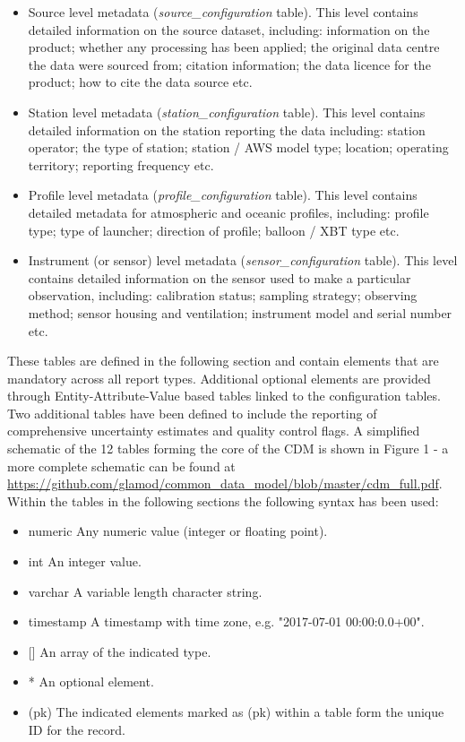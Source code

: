 \documentclass[a4paper,12pt]{article}
\begin{document}
\begin{itemize}
\item Source level metadata (\textit{source\_configuration} table). This level contains detailed information on the source dataset, including: information on the product; whether any processing has been applied; the original data centre the data were sourced from; citation information; the data licence for the product; how to cite the data source etc.
\item Station level metadata (\textit{station\_configuration} table). This level contains detailed information on the station reporting the data including: station operator; the type of station; station / AWS model type; location; operating territory; reporting frequency etc.
\item Profile level metadata (\textit{profile\_configuration} table). This level contains detailed metadata for atmospheric and oceanic profiles, including: profile type; type of launcher; direction of profile; balloon / XBT type etc.
\item Instrument (or sensor) level metadata (\textit{sensor\_configuration} table). This level contains detailed information on the sensor used to make a particular observation, including: calibration status; sampling strategy; observing method; sensor housing and ventilation; instrument model and serial number etc.
\end{itemize}

These tables are defined in the following section and contain elements that are mandatory across all report types. Additional optional elements are provided through Entity-Attribute-Value based tables linked to the configuration tables. Two additional tables have been defined to include the reporting of comprehensive uncertainty estimates and quality control flags. A simplified schematic of the 12 tables forming the core of the CDM is shown in Figure 1 - a more complete schematic can be found at \url{https://github.com/glamod/common_data_model/blob/master/cdm_full.pdf}. \\

Within the tables in the following sections the following syntax has been used:\\
\begin{itemize}
\item numeric \tabto{2 cm} Any numeric value (integer or floating point).
\item int \tabto{2 cm} An integer value.
\item varchar \tabto{2 cm} A variable length character string.
\item timestamp \tabto{2 cm} A timestamp with time zone, e.g. "2017-07-01 00:00:0.0+00".
\item {[]} \tabto{2 cm} An array of the indicated type.
\item {*} \tabto{2 cm} An optional element.
\item (pk) \tabto{2 cm} The indicated elements marked as (pk) within a table form the unique ID for the record.
\end {itemize}
\end{document}
